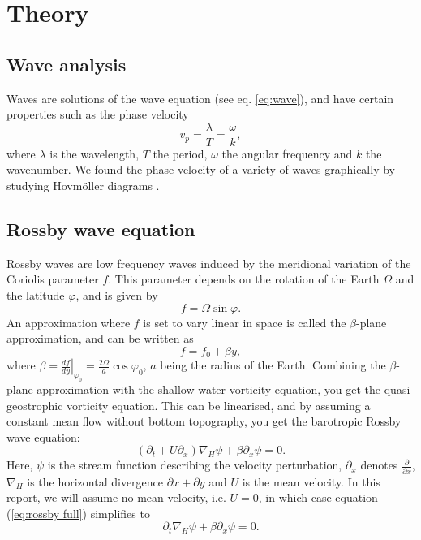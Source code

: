 \section{Theory}
\label{sec:theory}

\subsection{Wave analysis}
\label{sec:waves}
Waves are solutions of the wave equation (see eq. \ref{eq:wave}), and have certain properties such as the phase velocity
	\begin{equation}
	\label{eq:phase}
		v_p = \frac{\lambda}{T} = \frac{\omega}{k},
	\end{equation}
where $\lambda$ is the wavelength, $T$ the period, $\omega$ the angular frequency and $k$ the wavenumber.
We found the phase velocity of a variety of waves graphically by studying Hovmöller diagrams \citep{hovmoller}.

\subsection{Rossby wave equation}
\label{sec:wave}
Rossby waves are low frequency waves induced by the meridional
variation of the Coriolis parameter $f$. This parameter depends on the rotation of the Earth $\Omega$ and the latitude $\varphi$, and is given by
\begin{equation}
	f = \Omega \sin{\varphi}.
\end{equation}
An approximation where $f$ is set to vary linear in space is called the $\beta$-plane approximation, and can be written as
\begin{equation}\label{beta-plane}
	f = f_0 + \beta y,
\end{equation}
where $\beta = \left.\frac{df}{dy}\right|_{\varphi_0} = \frac{2\Omega}{a} \cos{\varphi_0}$, $a$ being the radius of the Earth. Combining the $\beta$-plane approximation with the shallow water vorticity equation, you get the quasi-geostrophic vorticity equation. This can be linearised, and by assuming a constant mean flow without bottom topography, you get the barotropic Rossby wave equation:
\begin{equation}\label{eq:rossby full}
	\left(\partial_t + U\partial_x \right) \nabla_H \psi + \beta \partial_x \psi = 0.
\end{equation}
Here, $\psi$ is the stream function describing the velocity perturbation, $\partial_x$ denotes $\frac{\partial}{\partial x}$, $\nabla_H$ is the horizontal divergence $\partial x + \partial y$ and $U$ is the mean velocity. In this report, we will assume no mean velocity, i.e. $U=0$, in which case equation (\ref{eq:rossby full}) simplifies to
\begin{equation}\label{eq:rossby}
	\partial_t \nabla_H \psi + \beta \partial_x \psi = 0.
\end{equation}

